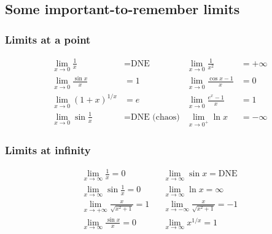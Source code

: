 \documentclass[main.tex]{subfiles}
\begin{document}
\begin{multicols}{2}
	\subsection*{Some important-to-remember limits}
	\subsubsection*{Limits at a point}
	\begin{align*}  %
		\lim_{x \to 0} \frac{1}{x} &= \text{DNE} & \lim_{x \to 0} \frac{1}{x^2} &= +\infty \\
		\lim_{x \to 0} \frac{\sin{x}}{x} &= 1 & \lim_{x \to 0} \frac{\cos{x} - 1}{x} &= 0 \\
		\lim_{x \to 0} (1 + x)^{1/x} &= e & \lim_{x \to 0} \frac{e^x - 1}{x} &= 1 \\
		\lim_{x \to 0} \sin{\frac{1}{x}} &= \text{DNE (chaos)} & \lim_{x \to 0^{+}} \ln{x} &= -\infty
	\end{align*}
	\subsubsection*{Limits at infinity}
	\begin{align*}
		\lim_{x \to \infty} \frac{1}{x} = 0 && \lim_{x \to \infty} \sin{x} = \text{DNE} \\
		\lim_{x \to \infty} \sin{\frac{1}{x}} = 0 && \lim_{x \to \infty} \ln{x} = \infty \\
		\lim_{x \to +\infty} \frac{x}{\sqrt{x^2 + 1}} = 1 && \lim_{x \to -\infty} \frac{x}{\sqrt{x^2 + 1}} = -1 \\
		\lim_{x \to \infty} \frac{\sin{x}}{x} = 0 && \lim_{x \to \infty} x^{1/x} = 1
	\end{align*}
\end{multicols}
\end{document}
